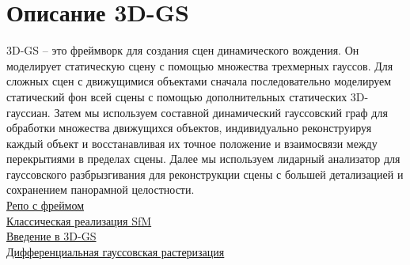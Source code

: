 \section{Описание 3D-GS}

3D-GS -- это фреймворк для создания сцен динамического вождения. Он моделирует статическую сцену с помощью множества трехмерных
гауссов. Для сложных сцен с движущимися объектами сначала последовательно моделируем статический фон всей сцены с помощью дополнительных статических 3D-гауссиан. Затем мы используем составной динамический гауссовский граф для обработки множества движущихся объектов, индивидуально реконструируя каждый объект и восстанавливая их точное положение
и взаимосвязи между перекрытиями в пределах сцены. Далее мы
используем лидарный анализатор для гауссовского разбрызгивания для реконструкции сцены с большей детализацией и сохранением панорамной
целостности.\\
\href{https://github.com/VDIGPKU/DrivingGaussian}{Репо с фреймом}\\
\href{https://habr.com/ru/articles/228525/}{Классическая реализация SfM}\\
\href{https://huggingface.co/blog/gaussian-splatting}{Введение в 3D-GS}\\
\href{https://github.com/graphdeco-inria/diff-gaussian-rasterization}{Дифференциальная гауссовская растеризация}


